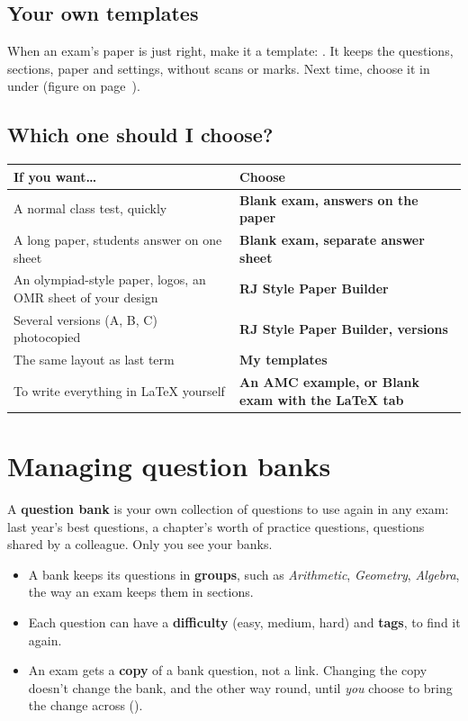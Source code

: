 \documentclass[11pt]{article}
\begin{document}
\subsection{Your own templates}\label{sec:mytemplates}

When an exam's paper is just right, make it a template:  \textrightarrow{} . It keeps the questions, sections, paper and settings, without scans or marks. Next time, choose it in  under  (figure on page~\pageref{sec:settings}).

\subsection{Which one should I choose?}

\begin{panel}
\renewcommand{\arraystretch}{1.35}
\begin{tabularx}{\linewidth}{@{}X>{\bfseries}p{62mm}@{}}
\toprule
\normalfont\bfseries If you want\ldots & Choose\\
\midrule
A normal class test, quickly & Blank exam, answers on the paper\\
A long paper, students answer on one sheet & Blank exam, separate answer sheet\\
An olympiad-style paper, logos, an OMR sheet of your design & RJ Style Paper Builder\\
Several versions (A, B, C) photocopied & RJ Style Paper Builder, versions\\
The same layout as last term & My templates\\
To write everything in LaTeX yourself & An AMC example, or Blank exam with the LaTeX tab\\
\bottomrule
\end{tabularx}
\end{panel}

\section{Managing question banks}\label{sec:banks}

A \textbf{question bank} is your own collection of questions to use again in any exam: last year's best questions, a chapter's worth of practice questions, questions shared by a colleague. Only you see your banks.

\begin{itemize}
  \item A bank keeps its questions in \textbf{groups}, such as \emph{Arithmetic}, \emph{Geometry}, \emph{Algebra}, the way an exam keeps them in sections.
  \item Each question can have a \textbf{difficulty} (easy, medium, hard) and \textbf{tags}, to find it again.
  \item An exam gets a \textbf{copy} of a bank question, not a link. Changing the copy doesn't change the bank, and the other way round, until \emph{you} choose to bring the change across ().
\end{itemize}
\end{document}

